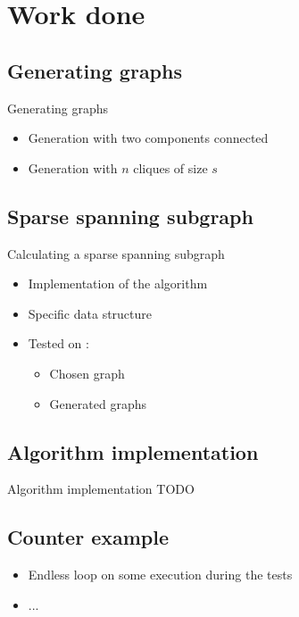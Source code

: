 \section{Work done}

\subsection{Generating graphs}
\begin{frame}{Generating graphs}
  \begin{itemize}
  \item Generation with two components connected
  \item Generation with $n$ cliques of size $s$
  \end{itemize}
\end{frame}

\subsection{Sparse spanning subgraph}
\begin{frame}{Calculating a sparse spanning subgraph}
  \begin{itemize}
  \item Implementation of the algorithm
  \item Specific data structure
  \item Tested on :
    \begin{itemize}
    \item Chosen graph
    \item Generated graphs
    \end{itemize}
  \end{itemize}
\end{frame}

\subsection{Algorithm implementation}
\begin{frame}{Algorithm implementation}
  TODO
\end{frame}

\subsection{Counter example}
\begin{frame}
  \begin{itemize}
  \item Endless loop on some execution during the tests
  \item ...
  \end{itemize}
\end{frame}


